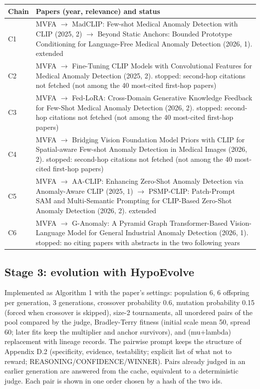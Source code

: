 \documentclass[11pt,a4paper]{article}
\begin{document}
\begin{tabularx}{\linewidth}{@{}l Y@{}}\toprule Chain & Papers (year, relevance) and status\\\midrule
C1 & MVFA $\rightarrow$ MadCLIP: Few-shot Medical Anomaly Detection with CLIP (2025, 2) $\rightarrow$ Beyond Static Anchors: Bounded Prototype Conditioning for Language-Free Medical Anomaly Detection (2026, 1). {\color{muted}extended}\\
C2 & MVFA $\rightarrow$ Fine-Tuning CLIP Models with Convolutional Features for Medical Anomaly Detection (2025, 2). {\color{muted}stopped: second-hop citations not fetched (not among the 40 most-cited first-hop papers)}\\
C3 & MVFA $\rightarrow$ Fed-LoRA: Cross-Domain Generative Knowledge Feedback for Few-Shot Medical Anomaly Detection (2026, 2). {\color{muted}stopped: second-hop citations not fetched (not among the 40 most-cited first-hop papers)}\\
C4 & MVFA $\rightarrow$ Bridging Vision Foundation Model Priors with CLIP for Spatial-aware Few-shot Anomaly Detection in Medical Images (2026, 2). {\color{muted}stopped: second-hop citations not fetched (not among the 40 most-cited first-hop papers)}\\
C5 & MVFA $\rightarrow$ AA-CLIP: Enhancing Zero-Shot Anomaly Detection via Anomaly-Aware CLIP (2025, 1) $\rightarrow$ PSMP-CLIP: Patch-Prompt SAM and Multi-Semantic Prompting for CLIP-Based Zero-Shot Anomaly Detection (2026, 2). {\color{muted}extended}\\
C6 & MVFA $\rightarrow$ G-Anomaly: A Pyramid Graph Transformer-Based Vision-Language Model for General Industrial Anomaly Detection (2026, 1). {\color{muted}stopped: no citing papers with abstracts in the two following years}\\
\bottomrule\end{tabularx}
\subsection{Stage 3: evolution with HypoEvolve}
Implemented as Algorithm 1 with the paper's settings: population 6, 6 offspring per generation, 3 generations, crossover probability 0.6, mutation probability 0.15 (forced when crossover is skipped), size-2 tournaments, all unordered pairs of the pool compared by the judge, Bradley-Terry fitness (initial scale mean 50, spread 60; later fits keep the multiplier and anchor survivors), and (mu+lambda) replacement with lineage records. The pairwise prompt keeps the structure of Appendix D.2 (specificity, evidence, testability; explicit list of what not to reward; REASONING/CONFIDENCE/WINNER). Pairs already judged in an earlier generation are answered from the cache, equivalent to a deterministic judge. Each pair is shown in one order chosen by a hash of the two ids.
\end{document}
